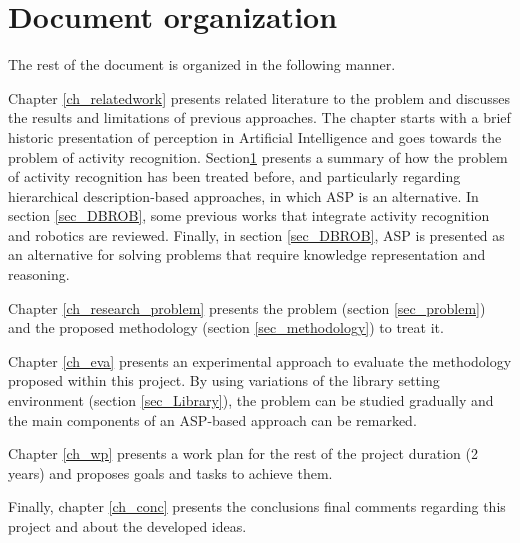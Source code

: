 








\section{Document organization}

The rest of the document is organized in the following manner.

Chapter \ref{ch_relatedwork} presents related literature to the problem and discusses the results and limitations of previous approaches. The chapter starts with a brief historic presentation of perception in Artificial Intelligence and goes towards the problem of activity recognition. Section\ref{} presents a summary of how the problem of activity recognition has been treated before, and particularly regarding hierarchical description-based approaches, in which ASP is an alternative. In section \ref{sec_DBROB}, some previous works that integrate activity recognition and robotics are reviewed. Finally, in section \ref{sec_DBROB}, ASP is presented as an alternative for solving problems that require knowledge representation and reasoning.

Chapter \ref{ch_research_problem} presents the problem (section \ref{sec_problem}) and the proposed methodology (section \ref{sec_methodology}) to treat it. 

Chapter \ref{ch_eva} presents an experimental approach to evaluate the methodology proposed within this project. By using variations of the library setting environment (section \ref{sec_Library}), the problem can be studied gradually and the main components of an ASP-based approach can be remarked.

Chapter \ref{ch_wp} presents a work plan for the rest of the project duration (2 years) and proposes goals and tasks to achieve them. 

Finally, chapter \ref{ch_conc} presents the conclusions final comments regarding this project and about the developed ideas.









